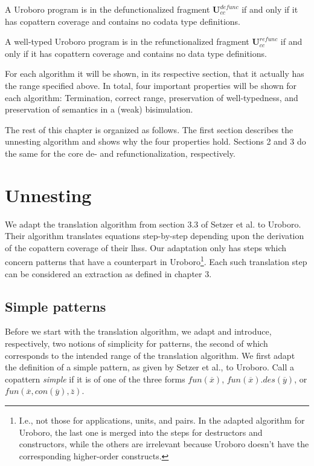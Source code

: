 \begin{definition}
A Uroboro program is in the defunctionalized fragment $\mathbf{U}^{defunc}_{cc}$ if and only if it has copattern coverage and contains no codata type definitions.
\end{definition}

\begin{definition}
A well-typed Uroboro program is in the refunctionalized fragment $\mathbf{U}^{refunc}_{cc}$ if and only if it has copattern coverage and contains no data type definitions.
\end{definition}

For each algorithm it will be shown, in its respective section, that it actually has the range specified above. In total, four important properties will be shown for each algorithm: Termination, correct range, preservation of well-typedness, and preservation of semantics in a (weak) bisimulation.

The rest of this chapter is organized as follows. The first section describes the unnesting algorithm and shows why the four properties hold. Sections 2 and 3 do the same for the core de- and refunctionalization, respectively.

\section{Unnesting}
\label{sec:unn}

We adapt the translation algorithm from section 3.3 of Setzer et al.\cite{setzer14unnesting} to Uroboro. Their algorithm translates equations step-by-step depending upon the derivation of the copattern coverage of their lhss. Our adaptation only has steps which concern patterns that have a counterpart in Uroboro\footnote{I.e., not those for applications, units, and pairs. In the adapted algorithm for Uroboro, the last one is merged into the steps for destructors and constructors, while the others are irrelevant because Uroboro doesn't have the corresponding higher-order constructs.}. Each such translation step can be considered an extraction as defined in chapter 3.

\subsection{Simple patterns}

Before we start with the translation algorithm, we adapt and introduce, respectively, two notions of simplicity for patterns, the second of which corresponds to the intended range of the translation algorithm. We first adapt the definition of a simple pattern, as given by Setzer et al., to Uroboro. Call a copattern \textit{simple} if it is of one of the three forms $fun(\overline{x})$, $fun(\overline{x}).des(\overline{y})$, or $fun(\overline{x}, con(\overline{y}), \overline{z})$.

